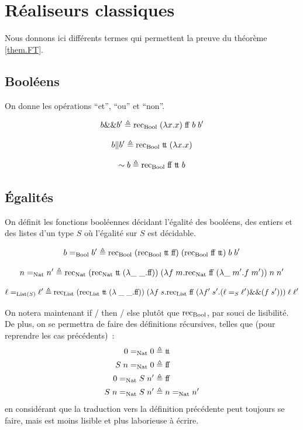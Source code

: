 \documentclass{article}
\begin{document}
\section{Réaliseurs classiques}\label{app.A}

Nous donnons ici différents termes qui permettent la preuve du théorème \ref{them.FT}.

\subsection{Booléens}

On donne les opérations ``et'', ``ou'' et ``non''.

\[b \&\& b' \triangleq \mathrm{rec}_{\mathrm{Bool}}\;(\lambda x.x)\;\mathrm{f}\!\mathrm{f}\;b\;b'\]

\[b \| b'\triangleq \mathrm{rec}_{\mathrm{Bool}}\;\mathrm{t}\!\mathrm{t}\;(\lambda x.x)\]

\[\sim b \triangleq \mathrm{rec}_{\mathrm{Bool}}\;\mathrm{f}\!\mathrm{f}\;\mathrm{t}\!\mathrm{t}\;b\]

\subsection{\'Egalités}

On définit les fonctions booléennes décidant l'égalité des booléens, des entiers et des listes d'un type $S$ où l'égalité sur $S$ est décidable.

\[b =_{\mathrm{Bool}} b' \triangleq \mathrm{rec}_{\mathrm{Bool}}\;(\mathrm{rec}_{\mathrm{Bool}}\;\mathrm{t}\!\mathrm{t}\;\mathrm{f}\!\mathrm{f})\;(\mathrm{rec}_{\mathrm{Bool}}\;\mathrm{f}\!\mathrm{f}\;\mathrm{t}\!\mathrm{t})\;b\;b'\]

\[n =_{\mathrm{Nat}} n' \triangleq \mathrm{rec}_{\mathrm{Nat}} \;(\mathrm{rec}_{\mathrm{Nat}}\;\mathrm{t}\!\mathrm{t}\;(\lambda \_\;\_.\mathrm{f}\!\mathrm{f}))\;(\lambda f\;m.\mathrm{rec}_{\mathrm{Nat}}\;\mathrm{f}\!\mathrm{f}\;(\lambda\_\;m'.f\;m'))\;n\;n'\]

\[\ell =_{\mathrm{List}(S)} \ell' \triangleq \mathrm{rec}_{\mathrm{List}}\;(\mathrm{rec}_{\mathrm{List}}\;\mathrm{t}\!\mathrm{t}\;(\lambda\;\_\;\_.\mathrm{f}\!\mathrm{f}))\;(\lambda f\;s.\mathrm{rec}_{\mathrm{List}}\;\mathrm{f}\!\mathrm{f}\;(\lambda f'\;s'.(\ell =_S \ell')\&\& (f\;s')))\;\ell\;\ell'\]

On notera maintenant if / then / else plutôt que $\mathrm{rec}_{\mathrm{Bool}}$, par souci de lisibilité. De plus, on se permettra de faire des définitions récursives, telles que (pour reprendre les cas précédents)~:
\begin{align*}
    0 =_{\mathrm{Nat}} 0 &\triangleq \mathrm{t}\!\mathrm{t} \\
    S\;n =_{\mathrm{Nat}} 0 &\triangleq \mathrm{f}\!\mathrm{f} \\
    0 =_{\mathrm{Nat}} S\;n' &\triangleq \mathrm{f}\!\mathrm{f}\\
    S\;n=_{\mathrm{Nat}} S\;n' &\triangleq n =_{\mathrm{Nat}} n'
\end{align*}
en considérant que la traduction vers la définition précédente peut toujours se faire, mais est moins lisible et plus laborieuse à écrire.
\end{document}
